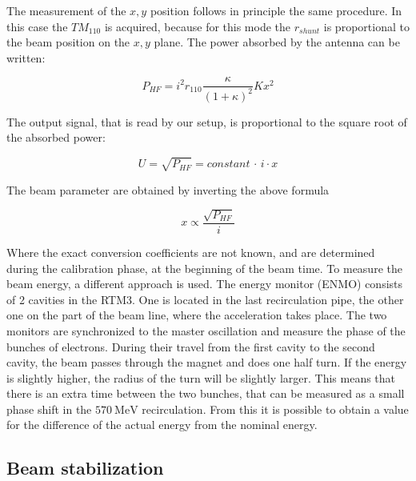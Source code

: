 The measurement of the $x,y$ position follows in principle the same procedure. In this case the $TM_{110}$ is acquired, because for this mode the $r_{shunt}$ is proportional to the beam position on the $x,y$ plane. The power absorbed by the antenna can be written:

\begin{equation}
P_{HF} = i^{2} r_{110} \frac{\kappa}{(1 + \kappa)^{2}} K x^{2}
\end{equation} 
 
The output signal, that is read by our setup, is proportional to the square root of the absorbed power:

\begin{equation}
U = \sqrt{P_{HF}} = constant \, \cdot \, i   \cdot x
\end{equation} 

The beam parameter are obtained by inverting the above formula 

\begin{equation} \label{eq:SignalToVfc}
x \propto \frac{\sqrt{P_{HF}}}{i}
\end{equation}

Where the exact conversion coefficients are not known, and are determined during the calibration phase, at the beginning of the beam time.
To measure the beam energy, a different approach is used. The energy monitor (ENMO) consists of 2 cavities in the RTM3. One is located in the last recirculation pipe, the other one on the part of the beam line, where the acceleration takes place. The two monitors are synchronized to the master oscillation and measure the phase of the bunches of electrons. During their travel from the first cavity to the second cavity, the beam passes through the magnet and does one half turn. If the energy is slightly higher, the radius of the turn will be slightly larger. This means that there is an extra time between the two bunches, that can be measured as a small phase shift in the $\SI{570}{\mega \electronvolt}$ recirculation. From this it is possible to obtain a value for the difference of the actual energy from the nominal energy.

\subsection{Beam stabilization}

